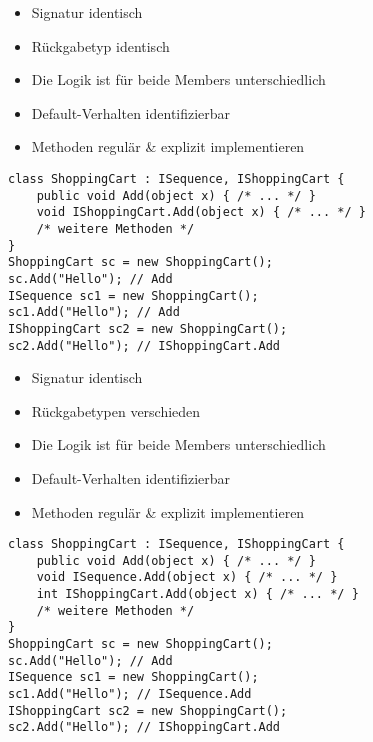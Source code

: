 \begin{multicols*}{2}
\begin{itemize}
    \item Signatur identisch
    \item Rückgabetyp identisch
    \item Die Logik ist für beide Members unterschiedlich
    \item Default-Verhalten identifizierbar
    \item Methoden regulär \& explizit implementieren
\end{itemize}
\begin{lstlisting}
class ShoppingCart : ISequence, IShoppingCart {
    public void Add(object x) { /* ... */ }
    void IShoppingCart.Add(object x) { /* ... */ }
    /* weitere Methoden */
}
ShoppingCart sc = new ShoppingCart(); 
sc.Add("Hello"); // Add
ISequence sc1 = new ShoppingCart(); 
sc1.Add("Hello"); // Add
IShoppingCart sc2 = new ShoppingCart(); 
sc2.Add("Hello"); // IShoppingCart.Add
\end{lstlisting}
\begin{itemize}
    \item Signatur identisch
    \item Rückgabetypen verschieden
    \item Die Logik ist für beide Members unterschiedlich
    \item Default-Verhalten identifizierbar
    \item Methoden regulär \& explizit implementieren
\end{itemize}
\begin{lstlisting}
class ShoppingCart : ISequence, IShoppingCart {
    public void Add(object x) { /* ... */ }
    void ISequence.Add(object x) { /* ... */ } 
    int IShoppingCart.Add(object x) { /* ... */ } 
    /* weitere Methoden */
}
ShoppingCart sc = new ShoppingCart(); 
sc.Add("Hello"); // Add
ISequence sc1 = new ShoppingCart(); 
sc1.Add("Hello"); // ISequence.Add 
IShoppingCart sc2 = new ShoppingCart(); 
sc2.Add("Hello"); // IShoppingCart.Add
\end{lstlisting}

\end{multicols*}